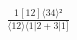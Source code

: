 \documentclass[varwidth, border=5pt]{standalone}
\begin{document}
\begin{my}
$\begin{gathered}
\scriptscriptstyle\frac{1[12]⟨34⟩²}{⟨12⟩⟨1|2+3|1]}
\end{gathered}$
\end{my}
\end{document}

